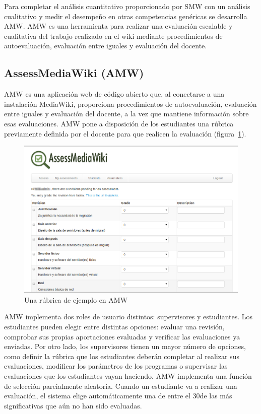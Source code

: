 	Para completar el análisis cuantitativo proporcionado por SMW con un análisis cualitativo y medir el desempeño en otras competencias genéricas se desarrolla AMW. AMW es una herramienta para realizar una evaluación escalable y cualitativa del trabajo realizado en el wiki mediante procedimientos de autoevaluación, evaluación entre iguales y evaluación del docente.

		\subsection{AssessMediaWiki (AMW)}

		AMW es una aplicación web de código abierto que, al conectarse a una instalación MediaWiki, proporciona procedimientos de autoevaluación, evaluación entre iguales y evaluación del docente, a la vez que mantiene información sobre esas evaluaciones. AMW pone a disposición de los estudiantes una rúbrica previamente definida por el docente para que realicen la evaluación (figura~\ref{fig:AmwRubrica}). 

\begin{figure}
  \begin{center}
    \includegraphics[scale=0.3]{AmwRubrica.png}
  \end{center}
  \caption{Una rúbrica de ejemplo en AMW}
  \label{fig:AmwRubrica}
\end{figure}

		AMW implementa dos roles de usuario distintos: supervisores y estudiantes. Los estudiantes pueden elegir entre distintas opciones: evaluar una revisión, comprobar sus propias aportaciones evaluadas y verificar las evaluaciones ya enviadas. Por otro lado, los supervisores tienen un mayor número de opciones, como definir la rúbrica que los estudiantes deberán completar al realizar sus evaluaciones, modificar los parámetros de los programas o supervisar las evaluaciones que los estudiantes vayan haciendo. AMW implementa una función de selección parcialmente aleatoria. Cuando un estudiante va a realizar una evaluación, el sistema elige automáticamente una de entre el 30\percentage{ }de las más significativas que aún no han sido evaluadas.

